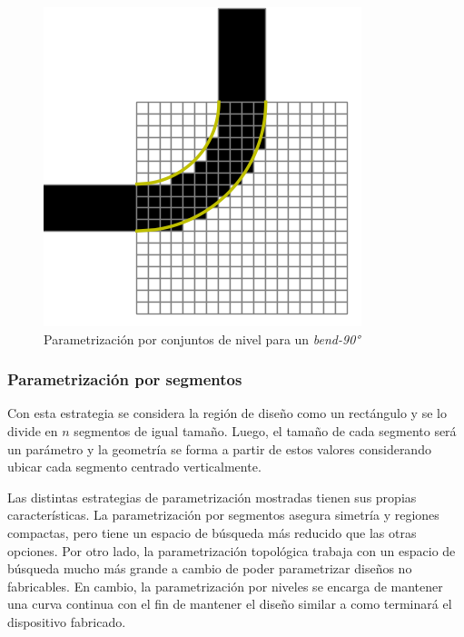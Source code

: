 \begin{figure}[h]
  \centering
  \includegraphics[scale=0.8]{image/theory/parametrization-levelsets.png}
  \caption{Parametrización por conjuntos de nivel para un \emph{bend-90°}}
  \label{fig:levelsets}
\end{figure}




\subsubsection{Parametrización por segmentos}

Con esta estrategia se considera la región de diseño como un rectángulo y se lo divide en $n$ segmentos de igual tamaño. 
Luego, el tamaño de cada segmento será un parámetro y la geometría se forma a partir de estos valores considerando ubicar cada segmento centrado verticalmente. 




Las distintas estrategias de parametrización mostradas tienen sus propias características.
La parametrización por segmentos asegura simetría y regiones compactas, pero tiene un espacio de búsqueda más reducido que las otras opciones.
Por otro lado, la parametrización topológica trabaja con un espacio de búsqueda mucho más grande a cambio de poder parametrizar diseños no fabricables.
En cambio, la parametrización por niveles se encarga de mantener una curva continua con el fin de mantener el diseño similar a como terminará el dispositivo fabricado.

